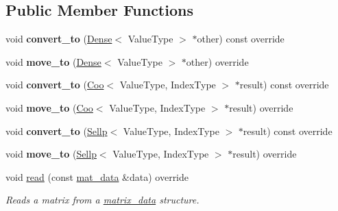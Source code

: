 \subsection*{Public Member Functions}
\begin{DoxyCompactItemize}
\item 
\mbox{\label{classgko_1_1matrix_1_1Csr_a610dfb71907ee0e79ca6470571cb1d10}} 
void {\bfseries convert\+\_\+to} (\hyperlink{classgko_1_1matrix_1_1Dense}{Dense}$<$ Value\+Type $>$ $\ast$other) const override
\item 
\mbox{\label{classgko_1_1matrix_1_1Csr_a794189da6f4443a991b7f68ed59c2f49}} 
void {\bfseries move\+\_\+to} (\hyperlink{classgko_1_1matrix_1_1Dense}{Dense}$<$ Value\+Type $>$ $\ast$other) override
\item 
\mbox{\label{classgko_1_1matrix_1_1Csr_ab0927bd9d5f77008d95891f266b9eb1d}} 
void {\bfseries convert\+\_\+to} (\hyperlink{classgko_1_1matrix_1_1Coo}{Coo}$<$ Value\+Type, Index\+Type $>$ $\ast$result) const override
\item 
\mbox{\label{classgko_1_1matrix_1_1Csr_a79c4a2730c1ef576d75fb8f2d98aecf2}} 
void {\bfseries move\+\_\+to} (\hyperlink{classgko_1_1matrix_1_1Coo}{Coo}$<$ Value\+Type, Index\+Type $>$ $\ast$result) override
\item 
\mbox{\label{classgko_1_1matrix_1_1Csr_aa7c16cb04e391ef7635e9b597ada39a3}} 
void {\bfseries convert\+\_\+to} (\hyperlink{classgko_1_1matrix_1_1Sellp}{Sellp}$<$ Value\+Type, Index\+Type $>$ $\ast$result) const override
\item 
\mbox{\label{classgko_1_1matrix_1_1Csr_ab5e533173f10bb8b0269ddf8374bfcff}} 
void {\bfseries move\+\_\+to} (\hyperlink{classgko_1_1matrix_1_1Sellp}{Sellp}$<$ Value\+Type, Index\+Type $>$ $\ast$result) override
\item 
void \hyperlink{classgko_1_1matrix_1_1Csr_ac4db41146ed3c3a8653b03d6b2c6c675}{read} (const \hyperlink{structgko_1_1matrix__data}{mat\+\_\+data} \&data) override
\begin{DoxyCompactList}\small\item\em Reads a matrix from a \hyperlink{structgko_1_1matrix__data}{matrix\+\_\+data} structure. \end{DoxyCompactList}\item 

\end{DoxyCompactItemize}
